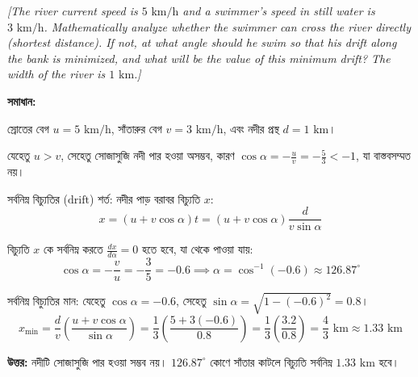 \documentclass[11pt,a4paper]{article}
\begin{document}
\smallskip
\textit{[The river current speed is $5\text{ km/h}$ and a swimmer's speed in still water is $3\text{ km/h}$. Mathematically analyze whether the swimmer can cross the river directly (shortest distance). If not, at what angle should he swim so that his drift along the bank is minimized, and what will be the value of this minimum drift? The width of the river is $1\text{ km}$.]}

\vspace{0.3cm}
\begin{center}
\end{center}

\textbf{সমাধান:}

স্রোতের বেগ $u = 5\text{ km/h}$, সাঁতারুর বেগ $v = 3\text{ km/h}$, এবং নদীর প্রস্থ $d = 1\text{ km}$।

যেহেতু $u > v$, সেহেতু সোজাসুজি নদী পার হওয়া অসম্ভব, কারণ $\cos\alpha = -\frac{u}{v} = -\frac{5}{3} < -1$, যা বাস্তবসম্মত নয়।

সর্বনিম্ন বিচ্যুতির ($\text{drift}$) শর্ত:
নদীর পাড় বরাবর বিচ্যুতি $x$:
$$x = (u + v\cos\alpha)t = (u + v\cos\alpha)\frac{d}{v\sin\alpha}$$

বিচ্যুতি $x$ কে সর্বনিম্ন করতে $\frac{dx}{d\alpha} = 0$ হতে হবে, যা থেকে পাওয়া যায়:
$$\cos\alpha = -\frac{v}{u} = -\frac{3}{5} = -0.6 \implies \alpha = \cos^{-1}(-0.6) \approx 126.87^\circ$$

সর্বনিম্ন বিচ্যুতির মান:
যেহেতু $\cos\alpha = -0.6$, সেহেতু $\sin\alpha = \sqrt{1 - (-0.6)^2} = 0.8$।
$$x_{\min} = \frac{d}{v} \left( \frac{u + v\cos\alpha}{\sin\alpha} \right) = \frac{1}{3} \left( \frac{5 + 3(-0.6)}{0.8} \right) = \frac{1}{3} \left( \frac{3.2}{0.8} \right) = \frac{4}{3}\text{ km} \approx 1.33\text{ km}$$

\textbf{উত্তর:} নদীটি সোজাসুজি পার হওয়া সম্ভব নয়। $126.87^\circ$ কোণে সাঁতার কাটলে বিচ্যুতি সর্বনিম্ন $1.33\text{ km}$ হবে।
\end{document}
